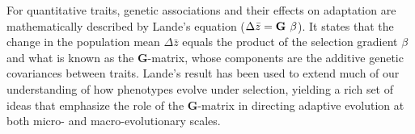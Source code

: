 \documentclass[11pt,twocolumn]{article}
\begin{document}
% 
% 
% 
% 

For quantitative traits, genetic associations and their effects on adaptation are mathematically described by Lande's equation ($\Delta \bar{z} = \textbf{G} \hspace{.05in}\beta$). It states that the change in the population mean $\Delta \bar{z}$ equals the product of the selection gradient $\beta$ and what is known as the \textbf{G}-matrix, whose components are the additive genetic covariances between traits. Lande’s result has been used to extend much of our understanding of how phenotypes evolve under selection, yielding a rich set of ideas that emphasize the role of the \textbf{G}-matrix in directing adaptive evolution at both micro- and macro-evolutionary scales.\par
% 
% 
\end{document}

